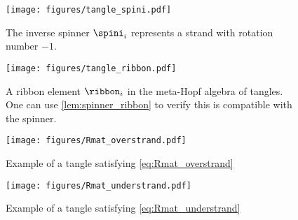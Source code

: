 \begin{figure}[h]
        \centering
        \texttt{[image: figures/tangle\_spini.pdf]}
        \caption{The inverse spinner $\spini_i$ represents a strand with
                rotation number $-1$.}
        \label{fig:tangle_spini}
\end{figure}
\begin{figure}[h]
        \centering
        \texttt{[image: figures/tangle\_ribbon.pdf]}
        \caption{A ribbon element $\ribbon_i$ in the meta-Hopf algebra of
                tangles. One can use \cref{lem:spinner_ribbon} to verify this is
                compatible with the spinner.
        }
        \label{fig:tangle_ribbon}
\end{figure}

\begin{figure}[h]
        \centering
        \texttt{[image: figures/Rmat\_overstrand.pdf]}
        \caption{Example of a tangle satisfying \cref{eq:Rmat_overstrand}}
        \label{fig:Rmat_overstrand}
\end{figure}
\begin{figure}[h]
        \centering
        \texttt{[image: figures/Rmat\_understrand.pdf]}
        \caption{Example of a tangle satisfying \cref{eq:Rmat_understrand}}
        \label{fig:Rmat_understrand}
\end{figure}
